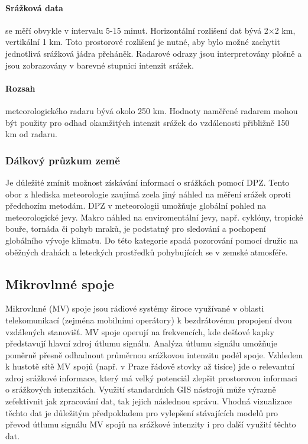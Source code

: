 \documentclass[a4paper,12pt]{report}
\begin{document}
\paragraph*{Srážková data} se měří obvykle v intervalu 5-15 minut. Horizontální rozlišení dat bývá 2×2 km, vertikální 1 km. Toto prostorové rozlišení je nutné, aby bylo možné zachytit jednotlivá srážková jádra přeháněk. Radarové odrazy jsou interpretovány plošně a jsou zobrazovány v barevné stupnici intenzit srážek.
\paragraph*{Rozsah} meteorologického radaru bývá okolo 250 km. Hodnoty naměřené radarem mohou být použity pro odhad okamžitých intenzit srážek do vzdálenosti přibližně 150 km od radaru.\cite{kohout}

\subsubsection{Dálkový průzkum země}
Je důležité zmínit možnost získávání informací o srážkách pomocí \acs{DPZ}. Tento obor z hlediska meteorologie zaujímá zcela jiný náhled na měření srážek oproti předchozím metodám. \acs{DPZ} v meteorologii umožňuje globální pohled na meteorologické jevy. Makro náhled na enviromentální jevy, např. cyklóny, tropické bouře, tornáda či pohyb mraků, je podstatný pro sledování a pochopení globálního vývoje klimatu. Do této kategorie spadá pozorování pomocí družic na oběžných drahách a leteckých prostředků pohybujících se v zemské atmosféře. 


\subsection{Mikrovlnné spoje}
Mikrovlnné (MV) spoje jsou rádiové systémy široce využívané v oblasti telekomunikací (zejména 
mobilními operátory) k bezdrátovému propojení dvou vzdálených stanovišť. MV spoje operují na 
frekvencích, kde dešťové kapky představují hlavní zdroj útlumu signálu. Analýza útlumu signálu 
umožňuje poměrně přesně odhadnout průměrnou srážkovou intenzitu podél spoje. Vzhledem 
k hustotě sítě MV spojů (např. v Praze řádově stovky až tisíce) jde o relevantní zdroj srážkové 
informace, který má velký potenciál zlepšit prostorovou informaci o srážkových intenzitách. Využití 
standardních GIS nástrojů může výrazně zefektivnit jak zpracování dat, tak jejich následnou správu. 
Vhodná vizualizace těchto dat je důležitým předpokladem pro vylepšení stávajících modelů pro 
převod útlumu signálu MV spojů na srážkové intenzity i pro další využití těchto dat.
 
\end{document}
